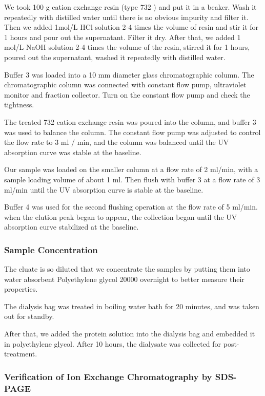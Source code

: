 We took 100 g cation exchange resin (type 732%
) and put it in a
beaker. Wash it repeatedly with distilled water until there is no obvious impurity and filter it. Then we added 1mol/L HCl solution 2-4
times the volume of resin and stir it for 1 hours and pour out the
supernatant. Filter it dry. After that, we added 1 mol/L NaOH solution 2-4 times the volume of the resin, stirred it for 1 hours, poured out the supernatant, washed it repeatedly with distilled water.

Buffer 3 was loaded into a 10 mm diameter glass chromatographic column.
The chromatographic column was connected with constant flow pump,
ultraviolet monitor and fraction collector. Turn on the constant flow
pump and check the tightness.

The treated 732 cation exchange resin was poured into the column, and buffer 3 was used to balance the column. The constant flow pump was
adjusted to control the flow rate to 3 ml / min, and the column was
balanced until the UV absorption curve was stable at the baseline.

Our sample was loaded on the smaller column at a flow rate of 2 ml/min, with a sample loading
volume of about 1 ml. Then flush with buffer 3 at a flow rate of 3 ml/min
until the UV absorption curve is stable at the baseline.

Buffer 4 was used for the second flushing operation at the flow rate of
5 ml/min. when the elution peak began to appear, the collection began
until the UV absorption curve stabilized at the baseline.

\subsubsection{Sample Concentration \citep{condense}}

The eluate is so diluted that we concentrate the samples by putting them into water absorbent Polyethylene glycol 20000 overnight to better measure their properties.

The dialysis bag was treated in boiling water bath for 20 minutes, and
was taken out for standby.

After that, we added the protein solution into the dialysis bag and embedded it in polyethylene glycol. After 10 hours, the dialysate was
collected for post-treatment.

\hypertarget{header-n36}{%
\subsubsection{Verification of Ion Exchange Chromatography by SDS-PAGE
}\label{header-n36}}

